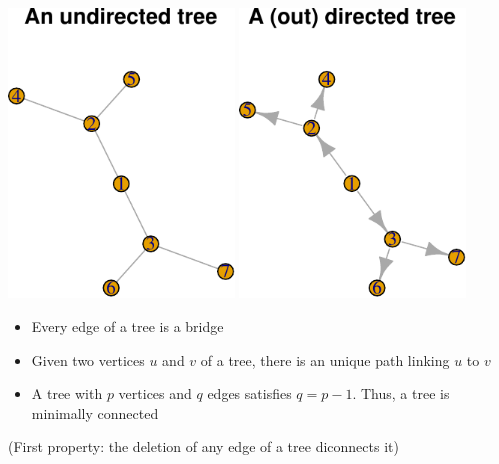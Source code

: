 \documentclass[aspectratio=169]{beamer}\usepackage[]{graphicx}\usepackage[]{xcolor}
\begin{document}
\begin{frame}
\begin{center}
\includegraphics[width=0.45\textwidth]{FIGS/graphs-make-trees-1.pdf}
\quad
\includegraphics[width=0.45\textwidth]{FIGS/graphs-make-trees-2.pdf}
\end{center}
\end{frame}


\begin{frame}
	\begin{property}
	\begin{itemize}
	\item Every edge of a tree is a bridge
	\item Given two vertices $u $ and $v$ of a tree, there is an unique path linking $u$ to $v$
	\item A tree with $p$ vertices and $q$ edges satisfies $q=p-1$. Thus, a tree is minimally connected
	\end{itemize}
	\end{property}
	\vfill
	(First property: the deletion of any edge of a tree diconnects it)
\end{frame}
\end{document}
